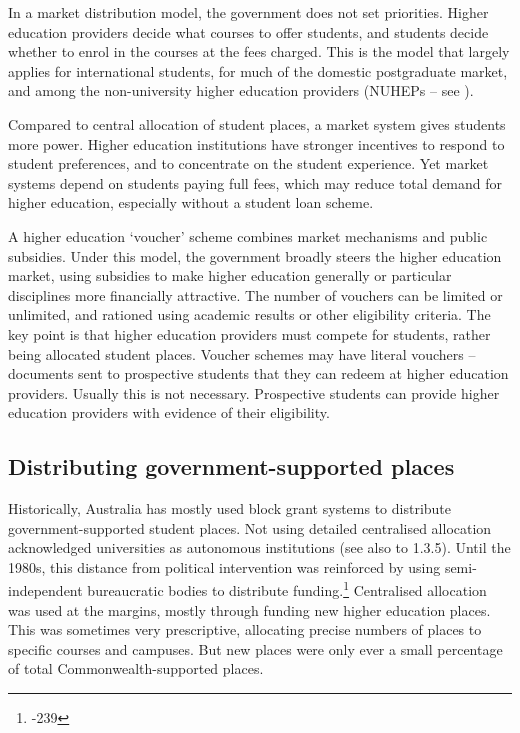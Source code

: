 \documentclass{grattan}
\begin{document}
In a market distribution model, the government does not set priorities. Higher education providers decide what courses to offer students, and students decide whether to enrol in the courses at the fees charged. This is the model that largely applies for international students, for much of the domestic postgraduate market, and among the non-university higher education providers (NUHEPs -- see ).

Compared to central allocation of student places, a market system gives students more power. Higher education institutions have stronger incentives to respond to student preferences, and to concentrate on the student experience. Yet market systems depend on students paying full fees, which may reduce total demand for higher education, especially without a student loan scheme.

A higher education `voucher' scheme combines market mechanisms and public subsidies. Under this model, the government broadly steers the higher education market, using subsidies to make higher education generally or particular disciplines more financially attractive. The number of vouchers can be limited or unlimited, and rationed using academic results or other eligibility criteria. The key point is that higher education providers must compete for students, rather being allocated student places. Voucher schemes may have literal vouchers -- documents sent to prospective students that they can redeem at higher education providers. Usually this is not necessary. Prospective students can provide higher education providers with evidence of their eligibility.

%
\subsection{Distributing government-supported places}\label{subsec:distributing-government-supported-places}

Historically, Australia has mostly used block grant systems to distribute government-supported student places. Not using detailed centralised allocation acknowledged universities as autonomous institutions (see also  to 1.3.5). Until the 1980s, this distance from political intervention was reinforced by using semi-independent bureaucratic bodies to distribute funding.\footnote{\textcite[][232]{Coaldrake2016raisingthestakes}-239} Centralised allocation was used at the margins, mostly through funding new higher education places. This was sometimes very prescriptive, allocating precise numbers of places to specific courses and campuses. But new places were only ever a small percentage of total Commonwealth-supported places.
\end{document}
